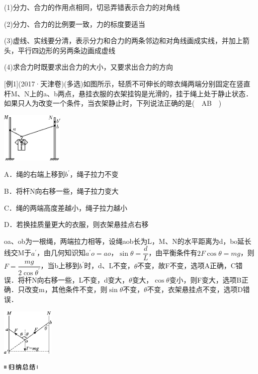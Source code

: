 (1)分力、合力的作用点相同，切忌弄错表示合力的对角线

(2)分力、合力的比例要一致，力的标度要适当

(3)虚线、实线要分清，表示分力和合力的两条邻边和对角线画成实线，并加上箭头，平行四边形的另两条边画成虚线

(4)求合力时既要求出合力的大小，又要求出合力的方向

{[}例1{]}(2017·天津卷)(多选)如图所示，轻质不可伸长的晾衣绳两端分别固定在竖直杆M、N上的a、b两点，悬挂衣服的衣架挂钩是光滑的，挂于绳上处于静止状态．如果只人为改变一个条件，当衣架静止时，下列说法正确的是(　AB　)

\begin{center}\includegraphics[width=1.17708in,height=0.94792in]{media/image68.png}\end{center}

A．绳的右端上移到$b^{\prime}$，绳子拉力不变

B．将杆N向右移一些，绳子拉力变大

C．绳的两端高度差越小，绳子拉力越小

D．若换挂质量更大的衣服，则衣架悬挂点右移
\begin{solution}
	oa、ob为一根绳，两端拉力相等，设绳aob长为L，M、N的水平距离为d，bo延长线交M于$a^{\prime}$，由几何知识知$a^{\prime}o=ao$，$\sin\theta=\dfrac{d}{L}$，由平衡条件有$2F\cos\theta=mg$，则$F=\dfrac{mg}{2\cos\theta^{\prime}}$，当b上移到$b^{\prime}$时，d、L不变，$\theta$不变，故F不变，选项A正确，C错误．将杆N向右移一些，L不变，d变大，$\theta$变大，$\cos\theta$变小，则F变大，选项B正确．只改变m，其他条件不变，则$\sin\theta$不变，$\theta$不变，衣架悬挂点不变，选项D错误．
\end{solution}


\begin{center}\includegraphics[width=1in,height=0.88542in]{media/image69.png}\end{center}
\begin{center}\includegraphics[width=0.70833in,height=0.125in]{media/image13.png}\end{center}

